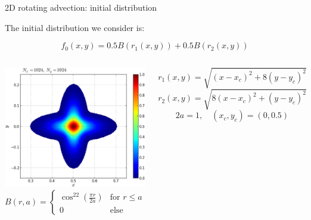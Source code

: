 \documentclass{beamer}
\begin{document}
\begin{frame}{2D rotating advection: initial distribution}

The initial distribution we consider is:

$$f_0(x,y) = 0.5 B(r_1(x,y)) + 0.5 B(r_2(x,y))$$

\begin{columns}
\hspace*{-5mm}\includegraphics[scale = 0.35]{graphics/f0_2drot_exact_highres}
\vspace*{-5mm}$$ B(r,a) =
  \begin{cases}
  \cos^{22}\left(\tfrac{\pi r}{2a}\right) & \text{for } r \leq a \\[0.5em]
   0       & \text{else }
  \end{cases}$$

\vspace*{-3mm}
 
$$r_1(x,y) = \sqrt{ (x - x_c)^2 + 8(y - y_c)^2}$$
$$r_2(x,y) = \sqrt{ 8(x - x_c)^2 + (y - y_c)^2}$$
$$2a = 1, \quad (x_c, y_c) = (0,0.5)$$
\end{columns}

\end{frame}
\end{document}
